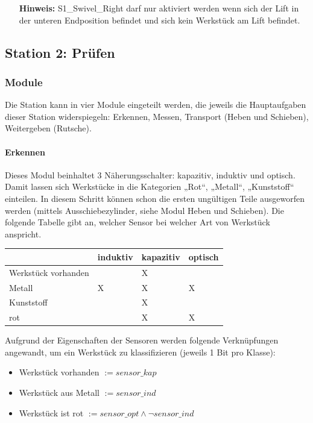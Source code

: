 \documentclass[11pt,a4paper,ngerman]{article}
\begin{document}
\begin{itemize}
	\item[\bf Hinweis:] S1\_Swivel\_Right darf nur aktiviert werden wenn sich der Lift in der unteren Endposition befindet und sich kein Werkstück am Lift befindet.
\end{itemize}



\subsection{Station 2: Prüfen}\label{station_pruefen}

\subsubsection{Module}

Die Station kann in vier Module eingeteilt werden, die jeweils die Hauptaufgaben dieser Station widerspiegeln: Erkennen, Messen, Transport (Heben und Schieben), Weitergeben (Rutsche).

\paragraph{Erkennen}
Dieses Modul beinhaltet 3 Näherungsschalter: kapazitiv, induktiv und optisch. Damit lassen sich Werkstücke in die Kategorien „Rot“, „Metall“, „Kunststoff“ einteilen. In diesem Schritt können schon die ersten ungültigen Teile ausgeworfen werden (mittels Ausschiebezylinder, siehe Modul Heben und Schieben). Die folgende Tabelle gibt an, welcher Sensor bei welcher Art von Werkstück anspricht.

\begin{center}
  \setlength\extrarowheight{4pt}
  \small
  \begin{tabular}{|p{5cm}|>{\Centering}p{1.5cm}|>{\Centering}p{1.5cm}|>{\Centering}p{1.5cm}|}
    \rowcolor{gray!80}
    \hline
    \bf  & \bf induktiv & \bf kapazitiv & \bf optisch \\
    \hline\hline
    Werkstück vorhanden & & X & \\
    Metall & X & X & X \\
    Kunststoff & & X & \\
    rot & & X & X \\
    \hline
  \end{tabular}
\end{center}

Aufgrund der Eigenschaften der Sensoren werden folgende Verknüpfungen angewandt, um ein Werkstück zu klassifizieren (jeweils 1 Bit pro Klasse):
\begin{itemize}
\item Werkstück vorhanden $:= sensor\_kap$
\item Werkstück aus Metall $:= sensor\_ind$
\item Werkstück ist rot $:= sensor\_opt \land \lnot sensor\_ind$
\end{itemize}
\end{document}
